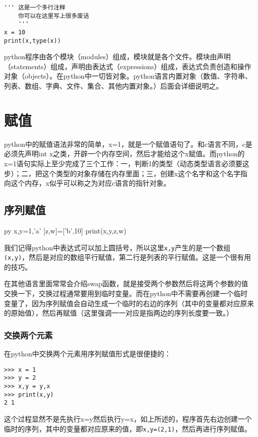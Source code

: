 \documentclass[12pt,oneside]{book}
\begin{document}
\begin{common-format}
\begin{Verbatim}
''' 这是一个多行注释
    你可以在这里写上很多废话
    '''
x = 10
print(x,type(x))
\end{Verbatim}

python程序由各个模块（modules）组成，模块就是各个文件。模块由声明（statements）组成，声明由表达式（expressions）组成，表达式负责创造和操作对象（objects）。在python中一切皆对象。python语言内置对象（数值、字符串、列表、数组、字典、文件、集合、其他内置对象。）后面会详细说明之。


\section{赋值}
python中的赋值语法非常的简单，x=1，就是一个赋值语句了。和c语言不同，c是必须先声明int x之类，开辟一个内存空间，然后才能给这个x赋值。而python的x=1语句实际上至少完成了三个工作：一，判断1的类型（动态类型语言必须要这步）；二，把这个类型的对象存储在内存里面；三，创建x这个名字和这个名字指向这个内存，x似乎可以称之为对应c语言的指针对象。

\subsection{序列赋值}
\begin{xverbatim}[129]{py}
x,y=1,'a'
[z,w]=['b',10]
print(x,y,z,w)
\end{xverbatim}

我们记得python中表达式可以加上圆括号，所以这里\verb+x,y+产生的是一个数组\verb+(x,y)+，然后是对应的数组平行赋值，第二行是列表的平行赋值。这是一个很有用的技巧。

在其他语言里面常常会介绍swap函数，就是接受两个参数然后将这两个参数的值交换一下，交换过程通常要用到临时变量。而在python中不需要再创建一个临时变量了，因为序列赋值会自动生成一个临时的右边的序列（其中的变量都对应原来的原始值），然后再赋值（这里强调一一对应是指两边的序列长度要一致。）

\subsubsection{交换两个元素}
在python中交换两个元素用序列赋值形式是很便捷的：
\begin{Verbatim}
>>> x = 1
>>> y = 2
>>> x,y = y,x
>>> print(x,y)
2 1
\end{Verbatim}
这个过程显然不是先执行x=y然后执行y=x，如上所述的，程序首先右边创建一个临时的序列，其中的变量都对应原来的值，即\verb+x,y=(2,1)+，然后再进行序列赋值。




\end{common-format}
\end{document}
